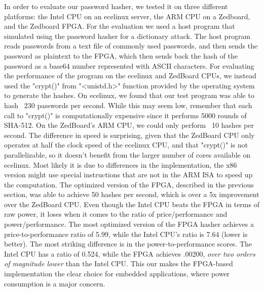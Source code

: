 In order to evaluate our password hasher, we tested it on three different platforms: the Intel CPU on an
ecelinux server, the ARM CPU on a Zedboard, and the Zedboard FPGA. For the evaluation we used a host program
that simulated using the password hasher for a dictionary attack. The host program reads passwords from
a text file of commonly used passwords, and then sends the password as plaintext to the FPGA, which
then sends back the hash of the password as a base64 number represented with ASCII characters. For
evaluating the performance of the program on the ecelinux and ZedBoard CPUs, we instead used the 
"crypt()" from "<unistd.h>" function provided by the operating system to generate the hashes. On
ecelinux, we found that our test program was able to hash ~230 passwords per second. While this may seem
low, remember that each call to "crypt()" is computationally expensive since it performs 5000 rounds of
SHA-512. On the ZedBoard's ARM CPU, we could only perform ~10 hashes per second. The difference in speed
is surprising, given that the ZedBoard CPU only operates at half the clock speed of the ecelinux CPU, and
that "crypt()" is not parallelizable, so it doesn't benefit from the larger number of cores available on
ecelinux. Most likely it is due to differences in the implementation, the x86 version might use special
instructions that are not in the ARM ISA to speed up the computation. The optimized version of the FPGA,
described in the previous section, was able to achieve 50 hashes per second, which is over a 5x
improvement over the ZedBoard CPU. Even though the Intel CPU beats the FPGA in terms of raw
power, it loses when it comes to the ratio of price/performance and power/performance. The most optimized
version of the FPGA hasher achieves a price-to-performance ratio of 5.99, while the Intel CPU's ratio is
7.64 (lower is better). The most striking difference is in the power-to-performance scores. The Intel CPU
has a ratio of 0.524, while the FPGA achieves .00200, \emph{over two orders of magnitude lower} than the
Intel CPU. This our makes the FPGA-based implementation the clear choice for embedded applications, where
power consumption is a major concern.
